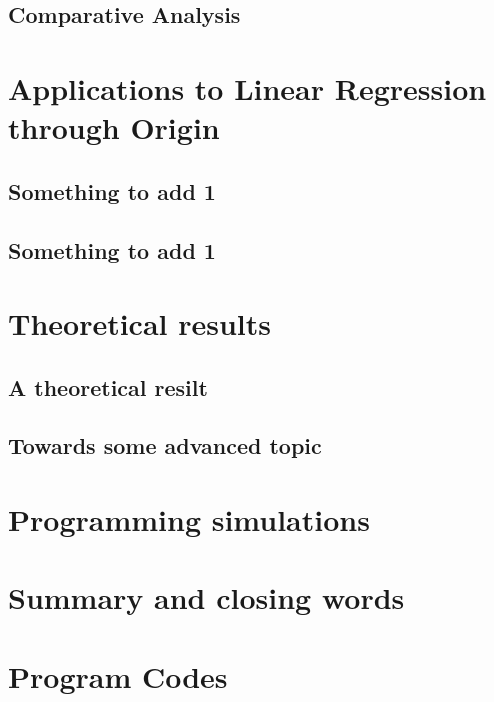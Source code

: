 \documentclass[12pt,a4paper,oneside]{book} %
\begin{document}
	\clearpage

	\section{Comparative Analysis}	
	
	\clearpage

	
	\chapter{Applications to Linear Regression through Origin} %


	\clearpage

	\section{Something to add 1} 
	
	\section{Something to add 1} 

	\chapter{Theoretical results} %
	
	\section{A theoretical resilt}
	
	\section{Towards some advanced topic}

	\chapter{Programming simulations} %


		
	\chapter{Summary and closing words}\label{ch:closing}
	



	
	
	
	
	\appendix
	
	\chapter{Program Codes}\label{ap:codes}
	
\end{document}
